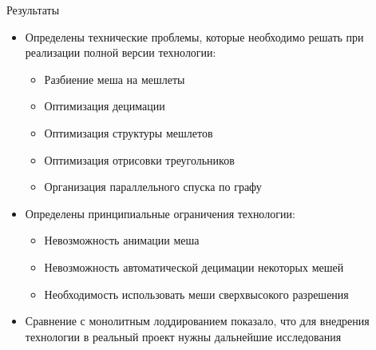 \begin{frame}{Результаты}
    \begin{itemize}
        \item Определены технические проблемы, которые необходимо решать при реализации полной версии технологии:
        \begin{itemize}
            \item Разбиение меша на мешлеты
            \item Оптимизация децимации
            \item Оптимизация структуры мешлетов
            \item Оптимизация отрисовки треугольников
            \item Организация параллельного спуска по графу
        \end{itemize}
        \item Определены принципиальные ограничения технологии:
        \begin{itemize}
            \item Невозможность анимации меша
            \item Невозможность автоматической децимации некоторых мешей
            \item Необходимость использовать меши сверхвысокого разрешения
        \end{itemize}
        \item Сравнение с монолитным лоддированием показало, что для внедрения технологии в реальный проект нужны дальнейшие исследования
    \end{itemize}
\end{frame}
